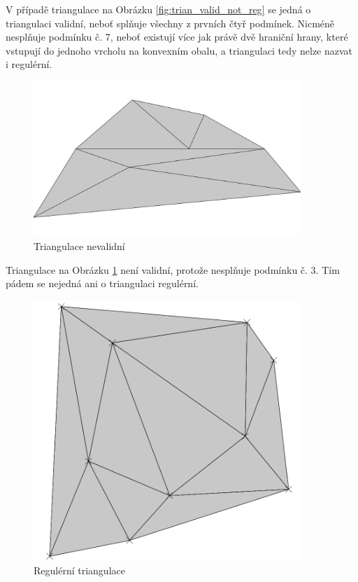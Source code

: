 \documentclass[12pt,a4paper]{article}
\begin{document}
V případě triangulace na Obrázku \ref{fig:trian_valid_not_reg} se jedná o triangulaci validní, neboť splňuje všechny z prvních čtyř podmínek. Nicméně nesplňuje podmínku č. 7, neboť existují více jak právě dvě hraniční hrany, které vstupují do jednoho vrcholu na konvexním obalu, a triangulaci tedy nelze nazvat i regulérní.

\begin{figure}[h!]
\centering
\includegraphics[width=0.9\textwidth]{../img/nv.png}
\caption{Triangulace nevalidní}
\label{fig:train_not_valid}
\end{figure}

Triangulace na Obrázku \ref{fig:train_not_valid} není validní, protože nesplňuje podmínku č. 3. Tím pádem se nejedná ani o triangulaci regulérní.

\newpage
\begin{figure}[h!]
\centering
\includegraphics[width=0.9\textwidth]{../img/triangulation.png}
\caption{Regulérní triangulace}
\label{fig:triangulace}
\end{figure}
\end{document}
